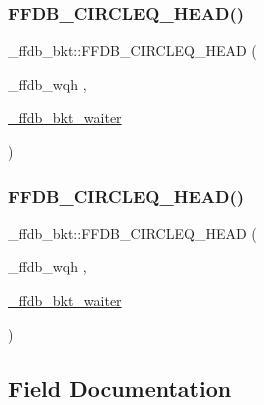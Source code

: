 \mbox{\label{struct__ffdb__bkt_af1ee791a45e4526e55dc86d09fb29769}} 
\subsubsection{\texorpdfstring{FFDB\_CIRCLEQ\_HEAD()}{FFDB\_CIRCLEQ\_HEAD()}\hspace{0.1cm}{\footnotesize\ttfamily [1/2]}}
{\footnotesize\ttfamily \+\_\+ffdb\+\_\+bkt\+::\+F\+F\+D\+B\+\_\+\+C\+I\+R\+C\+L\+E\+Q\+\_\+\+H\+E\+AD (\begin{DoxyParamCaption}\item[{\+\_\+ffdb\+\_\+wqh}]{,  }\item[{\mbox{\hyperlink{struct__ffdb__bkt__waiter}{\+\_\+ffdb\+\_\+bkt\+\_\+waiter}}}]{ }\end{DoxyParamCaption})}

\mbox{\label{struct__ffdb__bkt_af1ee791a45e4526e55dc86d09fb29769}} 
\subsubsection{\texorpdfstring{FFDB\_CIRCLEQ\_HEAD()}{FFDB\_CIRCLEQ\_HEAD()}\hspace{0.1cm}{\footnotesize\ttfamily [2/2]}}
{\footnotesize\ttfamily \+\_\+ffdb\+\_\+bkt\+::\+F\+F\+D\+B\+\_\+\+C\+I\+R\+C\+L\+E\+Q\+\_\+\+H\+E\+AD (\begin{DoxyParamCaption}\item[{\+\_\+ffdb\+\_\+wqh}]{,  }\item[{\mbox{\hyperlink{struct__ffdb__bkt__waiter}{\+\_\+ffdb\+\_\+bkt\+\_\+waiter}}}]{ }\end{DoxyParamCaption})}



\subsection{Field Documentation}
\mbox{\label{struct__ffdb__bkt_ab5210b13b17bfddd60495e09cce20e31}} 
